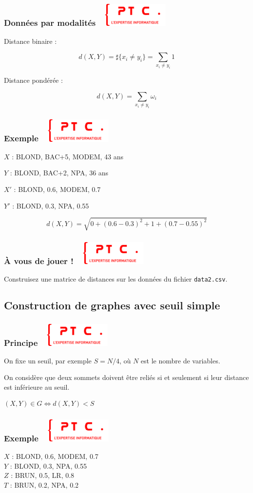 \documentclass[11pt]{beamer}
\newenvironment{slide}[1]{%
\begin{frame}[environment=slide]
\frametitle{#1~\hfill~\includegraphics[height=1.2cm]{./epitech.png}}
}{%
\end{frame}
}
\begin{document}
\begin{slide}{Données par modalités}

Distance binaire :

$$ d(X,Y) = \sharp \{ x_i \neq y_i \} = \sum_{x_i \neq y_i} 1 $$

Distance pondérée :

$$ d(X,Y) = \sum_{x_i \neq y_i} \omega_i $$

\end{slide}

\begin{slide}{Exemple}

$X$ : BLOND, BAC+5, MODEM, 43 ans

$Y$ : BLOND, BAC+2, NPA, 36 ans\\

\vspace{0.2cm}

\pause

$X'$ : BLOND, 0.6, MODEM, 0.7

$Y'$ : BLOND, 0.3, NPA, 0.55

\pause

$$d(X,Y) = \sqrt{0 + (0.6-0.3)^2 + 1 + (0.7-0.55)^2}$$

\end{slide}


\begin{slide}{{\`A} vous de jouer !}

Construisez une matrice de distances sur les données du fichier \texttt{data2.csv}.

\end{slide}

\subsection{Construction de graphes avec seuil simple}

\begin{slide}{Principe}

On fixe un seuil, par exemple $S=N/4$, où $N$ est le nombre de variables.

\pause

On considère que deux sommets doivent être reliés si et seulement si leur distance est inférieure au seuil.

$(X,Y) \in G \Longleftrightarrow d(X,Y) < S$

\end{slide}

\begin{slide}{Exemple}

$X$ : BLOND, 0.6, MODEM, 0.7\\
$Y$ : BLOND, 0.3, NPA, 0.55\\
$Z$ : BRUN, 0.5, LR, 0.8\\
$T$ : BRUN, 0.2, NPA, 0.2\\

\end{slide}
\end{document}
